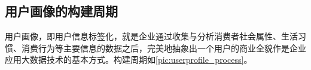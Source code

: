 		\subsection{用户画像的构建周期}
		用户画像，即用户信息标签化，就是企业通过收集与分析消费者社会属性、生活习惯、消费行为等主要信息的数据之后，完美地抽象出一个用户的商业全貌作是企业应用大数据技术的基本方式。构建周期如\autoref{pic:userprofile_process}。
		\begin{figure}
	    \centering
	      \label{pic:userprofile_process}
	    \end{figure}
